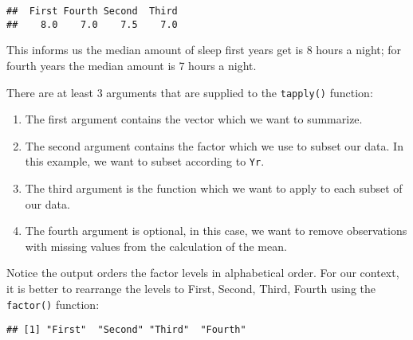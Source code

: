 \documentclass[
]{book}
\newenvironment{Shaded}{\begin{snugshade}}{\end{snugshade}}
\newcommand{\AttributeTok}[1]{\textcolor[rgb]{0.13,0.29,0.53}{#1}}
\newcommand{\DocumentationTok}[1]{\textcolor[rgb]{0.56,0.35,0.01}{\textbf{\textit{#1}}}}
\newcommand{\FunctionTok}[1]{\textcolor[rgb]{0.13,0.29,0.53}{\textbf{#1}}}
\newcommand{\NormalTok}[1]{#1}
\newcommand{\OtherTok}[1]{\textcolor[rgb]{0.56,0.35,0.01}{#1}}
\newcommand{\SpecialCharTok}[1]{\textcolor[rgb]{0.81,0.36,0.00}{\textbf{#1}}}
\newcommand{\StringTok}[1]{\textcolor[rgb]{0.31,0.60,0.02}{#1}}
\begin{document}
\begin{verbatim}
##  First Fourth Second  Third 
##    8.0    7.0    7.5    7.0
\end{verbatim}

This informs us the median amount of sleep first years get is 8 hours a night; for fourth years the median amount is 7 hours a night.

There are at least 3 arguments that are supplied to the \texttt{tapply()} function:

\begin{enumerate}
\def\labelenumi{\arabic{enumi}.}
\item
  The first argument contains the vector which we want to summarize.
\item
  The second argument contains the factor which we use to subset our data. In this example, we want to subset according to \texttt{Yr}.
\item
  The third argument is the function which we want to apply to each subset of our data.
\item
  The fourth argument is optional, in this case, we want to remove observations with missing values from the calculation of the mean.
\end{enumerate}

Notice the output orders the factor levels in alphabetical order. For our context, it is better to rearrange the levels to First, Second, Third, Fourth using the \texttt{factor()} function:

\begin{Shaded}
\end{Shaded}

\begin{verbatim}
## [1] "First"  "Second" "Third"  "Fourth"
\end{verbatim}

\begin{Shaded}
\end{Shaded}
\end{document}
